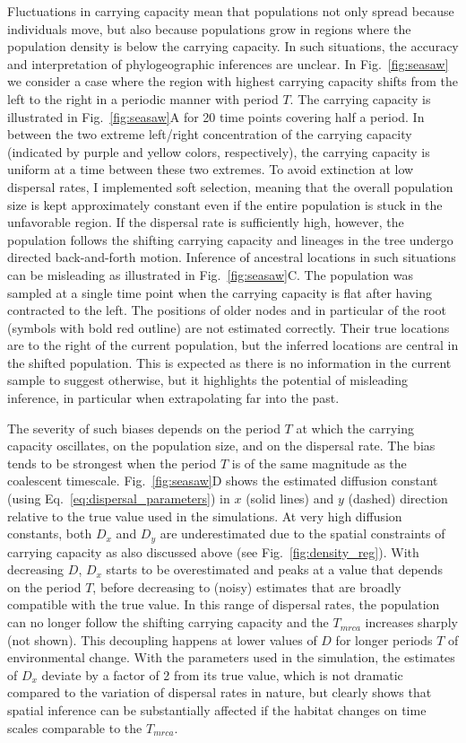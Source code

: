 \documentclass[aps,rmp, twocolumn]{revtex4}
\begin{document}
Fluctuations in carrying capacity mean that populations not only spread because individuals move, but also because populations grow in regions where the population density is below the carrying capacity.
In such situations, the accuracy and interpretation of phylogeographic inferences are unclear.
In Fig.~\ref{fig:seasaw} we consider a case where the region with highest carrying capacity shifts from the left to the right in a periodic manner with period $T$.
The carrying capacity is illustrated in Fig.~\ref{fig:seasaw}A for 20 time points covering half a period.
In between the two extreme left/right concentration of the carrying capacity (indicated by purple and yellow colors, respectively), the carrying capacity is uniform at a time between these two extremes.
To avoid extinction at low dispersal rates, I implemented soft selection, meaning that the overall population size is kept approximately constant even if the entire population is stuck in the unfavorable region.
If the dispersal rate is sufficiently high, however, the population follows the shifting carrying capacity and lineages in the tree undergo directed back-and-forth motion.
Inference of ancestral locations in such situations can be misleading as illustrated in Fig.~\ref{fig:seasaw}C.
The population was sampled at a single time point when the carrying capacity is flat after having contracted to the left.
The positions of older nodes and in particular of the root (symbols with bold red outline) are not estimated correctly.
Their true locations are to the right of the current population, but the inferred locations are central in the shifted population.
This is expected as there is no information in the current sample to suggest otherwise, but it highlights the potential of misleading inference, in particular when extrapolating far into the past.

The severity of such biases depends on the period $T$ at which the carrying capacity oscillates, on the population size, and on the dispersal rate. The bias tends to be strongest when the period $T$ is of the same magnitude as the coalescent timescale.
Fig.~\ref{fig:seasaw}D shows the estimated diffusion constant (using Eq.~\ref{eq:dispersal_parameters}) in $x$ (solid lines) and $y$ (dashed) direction relative to the true value used in the simulations.
At very high diffusion constants, both $D_x$ and $D_y$ are underestimated due to the spatial constraints of carrying capacity as also discussed above (see Fig.~\ref{fig:density_reg}).
With decreasing $D$, $D_x$ starts to be overestimated and peaks at a value that depends on the period $T$, before decreasing to (noisy) estimates that are broadly compatible with the true value.
In this range of dispersal rates, the population can no longer follow the shifting carrying capacity and the $T_{mrca}$ increases sharply (not shown).
This decoupling happens at lower values of $D$ for longer periods $T$ of environmental change.
With the parameters used in the simulation, the estimates of $D_x$ deviate by a factor of 2 from its true value, which is not dramatic compared to the variation of dispersal rates in nature, but clearly shows that spatial inference can be substantially affected if the habitat changes on time scales comparable to the $T_{mrca}$.
\end{document}
